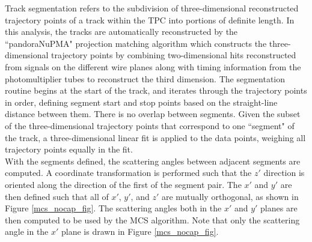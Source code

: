 \documentclass[a4paper,11pt]{article}
\begin{document}
Track segmentation refers to the subdivision of three-dimensional reconstructed trajectory points of a track within the TPC into portions of definite length. In this analysis, the tracks are automatically reconstructed by the ``pandoraNuPMA" projection matching algorithm which constructs the three-dimensional trajectory points by combining two-dimensional hits reconstructed from signals on the different wire planes along with timing information from the photomultiplier tubes to reconstruct the third dimension\cite{Marshall:2015rfa}. The segmentation routine begins at the start of the track, and iterates through the trajectory points in order, defining segment start and stop points based on the straight-line distance between them. There is no overlap between segments. Given the subset of the three-dimensional trajectory points that correspond to one ``segment" of the track, a three-dimensional linear fit is applied to the data points, weighing all trajectory points equally in the fit.\\

With the segments defined, the scattering angles between adjacent segments are computed. A coordinate transformation is performed such that the $z'$ direction is oriented along the direction of the first of the segment pair. The $x'$ and $y'$ are then defined such that all of $x'$, $y'$, and $z'$ are mutually orthogonal, as shown in Figure \ref{mcs_nocap_fig}. The scattering angles both in the $x'$ and $y'$ planes are then computed to be used by the MCS algorithm. Note that only the scattering angle in the $x'$ plane is drawn in Figure \ref{mcs_nocap_fig}.
\end{document}
